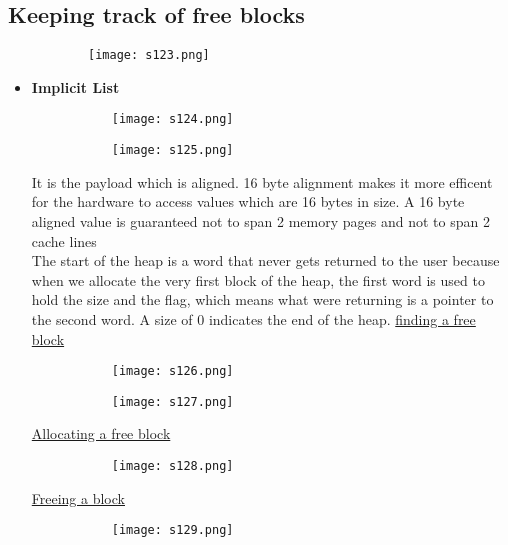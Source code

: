 \documentclass[8pt]{extreport}
\begin{document}
\subsection{Keeping track of free blocks}
\begin{figure}[H]
\centering
\begin{subfigure}[b]{0.4\linewidth}
\texttt{[image: s123.png]}
\end{subfigure}
\end{figure}
\begin{itemize}
\item \textbf{Implicit List}
\begin{figure}[H]
\centering
\begin{subfigure}[b]{0.4\linewidth}
\texttt{[image: s124.png]}
\end{subfigure}
\begin{subfigure}[b]{0.4\linewidth}
\texttt{[image: s125.png]}
\end{subfigure}
\end{figure}
It is the payload which is aligned. 16 byte alignment makes it more efficent for the hardware to access values which are 16 bytes in size. A 16 byte aligned value is guaranteed not to span 2 memory pages and not to span 2 cache lines\\
The start of the heap is a word that never gets returned to the user because when we allocate the very first block of the heap, the first word is used to hold the size and the flag, which means what were returning is a pointer to the second word. A size of 0 indicates the end of the heap.
\underline{finding a free block}
\begin{figure}[H]
\centering
\begin{subfigure}[b]{0.4\linewidth}
\texttt{[image: s126.png]}
\end{subfigure}
\begin{subfigure}[b]{0.4\linewidth}
\texttt{[image: s127.png]}
\end{subfigure}
\end{figure}
\underline{Allocating a free block}
\begin{figure}[H]
\centering
\begin{subfigure}[b]{0.4\linewidth}
\texttt{[image: s128.png]}
\end{subfigure}
\end{figure}
\underline{Freeing a block}
\begin{figure}[H]
\centering
\begin{subfigure}[b]{0.4\linewidth}
\texttt{[image: s129.png]}
\end{subfigure}
\end{figure}
\end{itemize}
\end{document}
